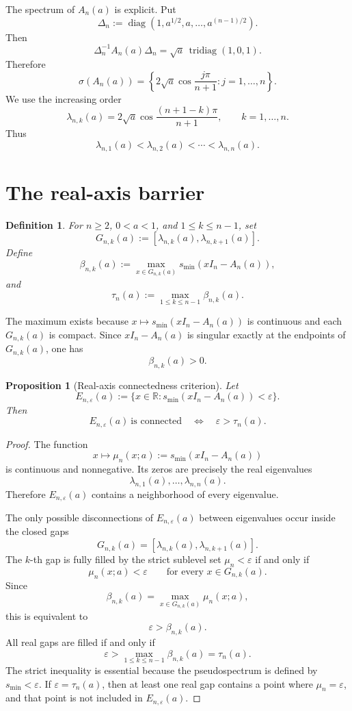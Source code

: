 \documentclass[11pt]{amsart}
\numberwithin{equation}{section}
\DeclareMathOperator{\tridiag}{tridiag}
\DeclareMathOperator{\diag}{diag}
\newcommand{\R}{\mathbb R}
\newcommand{\eps}{\varepsilon}
\newtheorem{proposition}[theorem]{Proposition}
\newtheorem{definition}[theorem]{Definition}
\begin{document}
The spectrum of \(A_n(a)\) is explicit.  Put
\[
\Delta_n:=\diag(1,a^{1/2},a,\dots,a^{(n-1)/2}).
\]
Then
\[
\Delta_n^{-1}A_n(a)\Delta_n
=
\sqrt a\,\tridiag(1,0,1).
\]
Therefore
\begin{equation}\label{eq:toeplitz-spectrum}
\sigma(A_n(a))
=
\left\{
2\sqrt a\cos\frac{j\pi}{n+1}:j=1,\dots,n
\right\}.
\end{equation}
We use the increasing order
\[
\lambda_{n,k}(a)
=
2\sqrt a\cos\frac{(n+1-k)\pi}{n+1},
\qquad k=1,\dots,n.
\]
Thus
\[
\lambda_{n,1}(a)<\lambda_{n,2}(a)<\cdots<\lambda_{n,n}(a).
\]

\section{The real-axis barrier}

\begin{definition}
For \(n\ge2\), \(0<a<1\), and \(1\le k\le n-1\), set
\[
G_{n,k}(a)
:=
[\lambda_{n,k}(a),\lambda_{n,k+1}(a)].
\]
Define
\[
\beta_{n,k}(a)
:=
\max_{x\in G_{n,k}(a)}
s_{\min}(xI_n-A_n(a)),
\]
and
\[
\tau_n(a)
:=
\max_{1\le k\le n-1}\beta_{n,k}(a).
\]
\end{definition}

The maximum exists because \(x\mapsto s_{\min}(xI_n-A_n(a))\) is continuous and each \(G_{n,k}(a)\) is compact.  Since \(xI_n-A_n(a)\) is singular exactly at the endpoints of \(G_{n,k}(a)\), one has
\[
\beta_{n,k}(a)>0.
\]

\begin{proposition}[Real-axis connectedness criterion]\label{prop:real-axis-connectedness}
Let
\[
E_{n,\eps}(a)
:=
\{x\in\R:s_{\min}(xI_n-A_n(a))<\eps\}.
\]
Then
\[
E_{n,\eps}(a)\ \text{is connected}
\quad\Longleftrightarrow\quad
\eps>\tau_n(a).
\]
\end{proposition}

\begin{proof}
The function
\[
x\mapsto\mu_n(x;a):=s_{\min}(xI_n-A_n(a))
\]
is continuous and nonnegative.  Its zeros are precisely the real eigenvalues
\[
\lambda_{n,1}(a),\dots,\lambda_{n,n}(a).
\]
Therefore \(E_{n,\eps}(a)\) contains a neighborhood of every eigenvalue.

The only possible disconnections of \(E_{n,\eps}(a)\) between eigenvalues occur inside the closed gaps
\[
G_{n,k}(a)=[\lambda_{n,k}(a),\lambda_{n,k+1}(a)].
\]
The \(k\)-th gap is fully filled by the strict sublevel set \(\mu_n<\eps\) if and only if
\[
\mu_n(x;a)<\eps
\qquad
\text{for every }x\in G_{n,k}(a).
\]
Since
\[
\beta_{n,k}(a)=\max_{x\in G_{n,k}(a)}\mu_n(x;a),
\]
this is equivalent to
\[
\eps>\beta_{n,k}(a).
\]
All real gaps are filled if and only if
\[
\eps>\max_{1\le k\le n-1}\beta_{n,k}(a)=\tau_n(a).
\]
The strict inequality is essential because the pseudospectrum is defined by \(s_{\min}<\eps\).  If \(\eps=\tau_n(a)\), then at least one real gap contains a point where \(\mu_n=\eps\), and that point is not included in \(E_{n,\eps}(a)\).
\end{proof}
\end{document}
